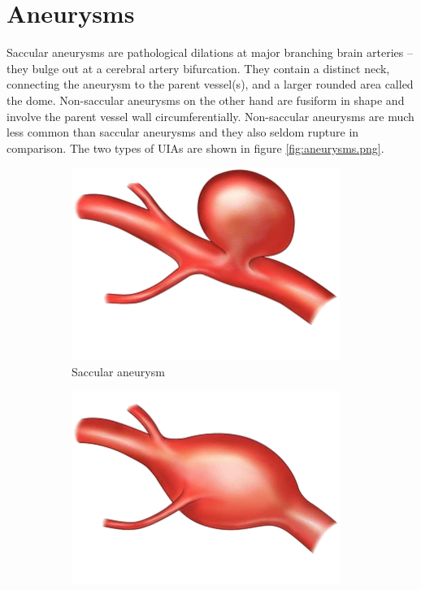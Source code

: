 \section{Aneurysms}
Saccular aneurysms are pathological dilations at major branching brain arteries -- they bulge out at a cerebral artery bifurcation. They contain a distinct neck, connecting the aneurysm to the parent vessel(s), and a larger rounded area called the dome. Non-saccular aneurysms on the other hand are fusiform  in shape and involve the parent vessel wall circumferentially. Non-saccular aneurysms are much less common than saccular aneurysms and they also seldom rupture in comparison. The two types of UIAs are shown in figure \ref{fig:aneurysms.png}.

\begin{figure}[h]
	\centering
	\begin{subfigure}{.45\linewidth}
		\includegraphics[width=\linewidth]{figures/saccular.png}
		\caption[Saccular aneurysm]{Saccular aneurysm}
	\end{subfigure}
	\begin{subfigure}{.45\linewidth}
		\includegraphics[width=\linewidth]{figures/fusiform.png}

\end{subfigure}
\end{figure}
